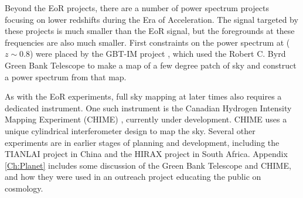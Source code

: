 Beyond the EoR projects, there are a number of power spectrum projects focusing on lower redshifts during the Era of Acceleration. The \cm signal targeted by these projects is much smaller than the EoR signal, but the foregrounds at these frequencies are also much smaller. First constraints on the power spectrum at ($z \sim 0.8$) were placed by the GBT-IM project \cite{masui_2012}\cite{switzer_2013}, which used the Robert C. Byrd Green Bank Telescope to make a map of a few degree patch of sky and construct a power spectrum from that map. 

As with the EoR experiments, full sky mapping at later times also requires a dedicated instrument. One such instrument is the Canadian Hydrogen Intensity Mapping Experiment (CHIME) \cite{shaw_2014}\cite{chime}, currently under development. CHIME uses a unique cylindrical interferometer design to map the sky. Several other experiments are in earlier stages of planning and development, including the TIANLAI project in China and the HIRAX project in South Africa. Appendix \ref{Ch:Planet} includes some discussion of the Green Bank Telescope and CHIME, and how they were used in an outreach project educating the public on \cm cosmology. 

